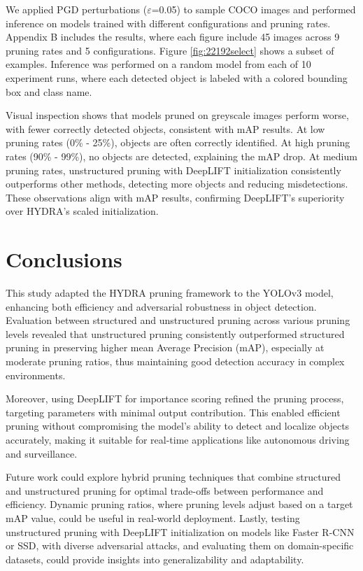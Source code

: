 \documentclass[10pt]{cai}
\begin{document}
We applied PGD perturbations ($\varepsilon$=0.05) to sample COCO images and performed inference on models trained with different configurations and pruning rates. Appendix B includes the results, where each figure include 45 images across 9 pruning rates and 5 configurations. Figure \ref{fig:22192select} shows a subset of examples. Inference was performed on a random model from each of 10 experiment runs, where each detected object is labeled with a colored bounding box and class name.

Visual inspection shows that models pruned on greyscale images perform worse, with fewer correctly detected objects, consistent with mAP results. At low pruning rates (0\% - 25\%), objects are often correctly identified. At high pruning rates (90\% - 99\%), no objects are detected, explaining the mAP drop. At medium pruning rates, unstructured pruning with DeepLIFT initialization consistently outperforms other methods, detecting more objects and reducing misdetections. These observations align with mAP results, confirming DeepLIFT's superiority over HYDRA's scaled initialization.


\section{Conclusions}
This study adapted the HYDRA pruning framework to the YOLOv3 model, enhancing both efficiency and adversarial robustness in object detection. Evaluation between structured and unstructured pruning across various pruning levels revealed that unstructured pruning consistently outperformed structured pruning in preserving higher mean Average Precision (mAP), especially at moderate pruning ratios, thus maintaining good detection accuracy in complex environments. 

Moreover, using DeepLIFT for importance scoring refined the pruning process, targeting parameters with minimal output contribution. This enabled efficient pruning without compromising the model's ability to detect and localize objects accurately, making it suitable for real-time applications like autonomous driving and surveillance.

Future work could explore hybrid pruning techniques that combine structured and unstructured pruning for optimal trade-offs between performance and efficiency. Dynamic pruning ratios, where pruning levels adjust based on a target mAP value, could be useful in real-world deployment. Lastly, testing unstructured pruning with DeepLIFT initialization on models like Faster R-CNN or SSD, with diverse adversarial attacks, and evaluating them on domain-specific datasets, could provide insights into generalizability and adaptability.
\end{document}
